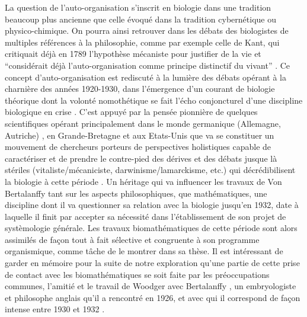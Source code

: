 La question de l'auto-organisation s'inscrit en biologie dans une tradition beaucoup plus ancienne que celle évoqué dans la tradition cybernétique ou physico-chimique. On pourra ainsi retrouver dans les débats des biologistes de multiples références à la philosophie, comme par exemple celle de Kant, qui critiquait déjà en 1789 l'hypothèse mécaniste pour justifier de la vie et \enquote{considérait déjà l'auto-organisation comme principe distinctif du vivant} \autocites[76]{Pouvreau2013}[275]{Mossio2010}[6]{Mossio2014}. Ce concept d'auto-organisation \autocite[68]{Stengers1985} est rediscuté à la lumière des débats opérant à la charnière des années 1920-1930, dans l'émergence d'un courant de biologie théorique dont la volonté nomothétique se fait l'écho conjoncturel d'une discipline biologique en crise \autocites[421-434]{Pouvreau2013}. C'est appuyé par la pensée pionnière de quelques scientifiques opérant principalement dans le monde germanique (Allemagne, Autriche) \autocite{Drack2007b}, en Grande-Bretagne et aux Etats-Unis que va se constituer un mouvement de chercheurs porteurs de perspectives holistiques capable de caractériser et de prendre le contre-pied des dérives et des débats jusque là stériles (vitaliste/mécaniciste, darwinisme/lamarckisme, etc.) qui décrédibilisent la biologie à cette période \autocite[153-154]{Pouvreau2013}. Un héritage qui va influencer les travaux de Von Bertalanffy tant sur les aspects philosophiques, que mathématiques, une discipline dont il va questionner sa relation avec la biologie \autocite{Pouvreau2005} jusqu'en 1932, date à laquelle il finit par accepter sa nécessité dans l'établissement de son projet de systèmologie générale. Les travaux biomathématiques de cette période sont alors assimilés de façon tout à fait sélective et congruente à son programme organismique, comme tâche de le montrer \textcite[515]{Pouvreau2013} dans sa thèse. Il est intéressant de garder en mémoire pour la suite de notre exploration qu'une partie de cette prise de contact avec les biomathématiques se soit faite par les préoccupations communes, l'amitié et le travail de Woodger avec Bertalanffy \autocite[347,433]{Pouvreau2013}, un embryologiste et philosophe anglais qu'il a rencontré en 1926, et avec qui il correspond de façon intense entre 1930 et 1932 \autocite[165]{Pouvreau2013}. 

